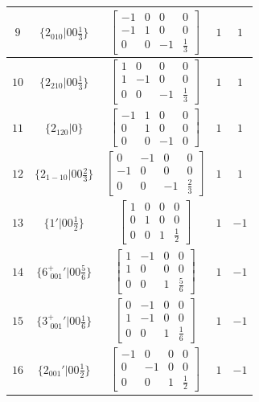 \documentclass[fleqn,8pt]{jsarticle}
\begin{document}
\begin{longtable}{ccccc}
$ 9 $ & $ \{2{}_{010}|0 0 \frac{1}{3}\} $ & $ \begin{bmatrix} -1 & 0 & 0 & 0 \\ -1 & 1 & 0 & 0 \\ 0 & 0 & -1 & \frac{1}{3} \end{bmatrix} $ & $ 1 $ & $ 1 $ \\ \hline
$ 10 $ & $ \{2{}_{210}|0 0 \frac{1}{3}\} $ & $ \begin{bmatrix} 1 & 0 & 0 & 0 \\ 1 & -1 & 0 & 0 \\ 0 & 0 & -1 & \frac{1}{3} \end{bmatrix} $ & $ 1 $ & $ 1 $ \\ \hline
$ 11 $ & $ \{2{}_{120}|0\} $ & $ \begin{bmatrix} -1 & 1 & 0 & 0 \\ 0 & 1 & 0 & 0 \\ 0 & 0 & -1 & 0 \end{bmatrix} $ & $ 1 $ & $ 1 $ \\ \hline
$ 12 $ & $ \{2{}_{1-10}|0 0 \frac{2}{3}\} $ & $ \begin{bmatrix} 0 & -1 & 0 & 0 \\ -1 & 0 & 0 & 0 \\ 0 & 0 & -1 & \frac{2}{3} \end{bmatrix} $ & $ 1 $ & $ 1 $ \\ \hline
$ 13 $ & $ \{1{}'|0 0 \frac{1}{2}\} $ & $ \begin{bmatrix} 1 & 0 & 0 & 0 \\ 0 & 1 & 0 & 0 \\ 0 & 0 & 1 & \frac{1}{2} \end{bmatrix} $ & $ 1 $ & $ -1 $ \\ \hline
$ 14 $ & $ \{6^{+}_{\,\,001}{}'|0 0 \frac{5}{6}\} $ & $ \begin{bmatrix} 1 & -1 & 0 & 0 \\ 1 & 0 & 0 & 0 \\ 0 & 0 & 1 & \frac{5}{6} \end{bmatrix} $ & $ 1 $ & $ -1 $ \\ \hline
$ 15 $ & $ \{3^{+}_{\,\,001}{}'|0 0 \frac{1}{6}\} $ & $ \begin{bmatrix} 0 & -1 & 0 & 0 \\ 1 & -1 & 0 & 0 \\ 0 & 0 & 1 & \frac{1}{6} \end{bmatrix} $ & $ 1 $ & $ -1 $ \\ \hline
$ 16 $ & $ \{2{}_{001}{}'|0 0 \frac{1}{2}\} $ & $ \begin{bmatrix} -1 & 0 & 0 & 0 \\ 0 & -1 & 0 & 0 \\ 0 & 0 & 1 & \frac{1}{2} \end{bmatrix} $ & $ 1 $ & $ -1 $ \\ \hline

\end{longtable}
\end{document}
